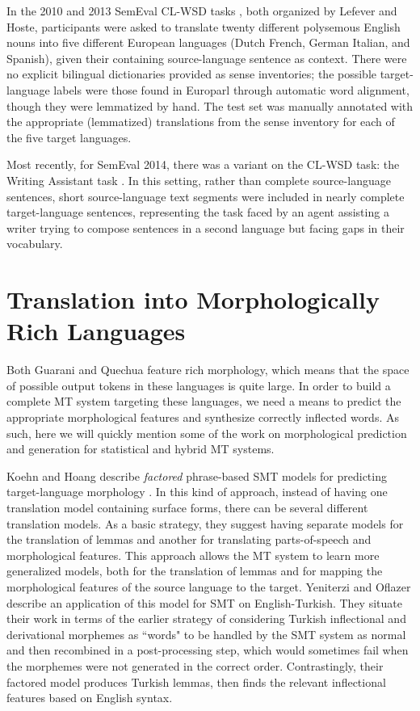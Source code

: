 In the 2010 and 2013 SemEval CL-WSD tasks
\cite{lefever-hoste:2010:SemEval,task10}, both organized by Lefever and Hoste,
participants were asked to translate twenty different polysemous English nouns
into five different European languages (Dutch French, German Italian, and
Spanish), given their containing source-language sentence as context. There
were no explicit bilingual dictionaries provided as sense inventories; the
possible target-language labels were those found in Europarl \cite{europarl}
through automatic word alignment, though they were lemmatized by hand. The test
set was manually annotated with the appropriate (lemmatized) translations from
the sense inventory for each of the five target languages.

Most recently, for SemEval 2014, there was a variant on the CL-WSD task: the
Writing Assistant task \cite{vangompel-EtAl:2014:SemEval}. In this setting,
rather than complete source-language sentences, short source-language text
segments were included in nearly complete target-language sentences,
representing the task faced by an agent assisting a writer trying to compose
sentences in a second language but facing gaps in their vocabulary.

\section{Translation into Morphologically Rich Languages}
Both Guarani and Quechua feature rich morphology, which means that the space of
possible output tokens in these languages is quite large. In order to build a
complete MT system targeting these languages, we need a means to predict the
appropriate morphological features and synthesize correctly inflected words. As
such, here we will quickly mention some of the work on morphological prediction
and generation for statistical and hybrid MT systems.

Koehn and Hoang describe \emph{factored} phrase-based SMT models for predicting
target-language morphology \cite{koehn-hoang:2007:EMNLP-CoNLL2007}. In this
kind of approach, instead of having one translation model containing surface
forms, there can be several different translation models. As a basic strategy,
they suggest having separate models for the translation of lemmas and another
for translating parts-of-speech and morphological features. This approach
allows the MT system to learn more generalized models, both for the translation
of lemmas and for mapping the morphological features of the source language to
the target.
Yeniterzi and Oflazer \cite{yeniterzi-oflazer:2010:ACL} describe an
application of this model for SMT on English-Turkish.
They situate their work in terms of the earlier strategy of considering Turkish
inflectional and derivational morphemes as ``words" to be handled by the SMT
system as normal and then recombined in a post-processing step, which would
sometimes fail when the morphemes were not generated in the correct order.
Contrastingly, their factored model produces Turkish lemmas, then finds the
relevant inflectional features based on English syntax.

